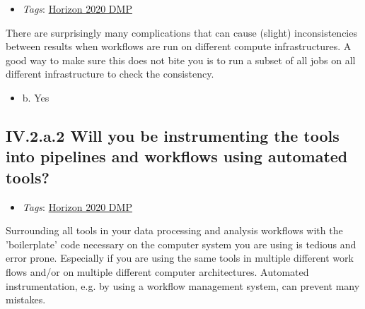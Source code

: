 \documentclass[a4paper,12pt]{report}
\begin{document}
\label{10a10ffd-bfe1-4c6b-bbb6-3dfb1e63a5d5.918d5fd1-ea37-468f-8acd-ca3e80203900.30d1e85c-0e3e-482f-97f9-22a7658b329e.e8a08f27-9f82-4147-b446-822d34a5d468}


\begin{itemize}
  \item \textit{Tags}: \ul{Horizon 2020 DMP}
  \end{itemize}


\noindent
\begin{markdown}
There are surprisingly many complications that can cause (slight) inconsistencies between results when workflows are run on different compute infrastructures. A good way to make sure this does not bite you is to run a subset of all jobs on all different infrastructure to check the consistency.
\end{markdown}



\begin{itemize}
  \item[\CheckmarkBold] b. Yes
\end{itemize}




\subsection*{\protect\textcolor{colorSecId}{IV.2.a.2} Will you be instrumenting the tools into pipelines and workflows using automated tools?}

\label{10a10ffd-bfe1-4c6b-bbb6-3dfb1e63a5d5.918d5fd1-ea37-468f-8acd-ca3e80203900.30d1e85c-0e3e-482f-97f9-22a7658b329e.a3a4ce37-4ced-41df-8ec6-e42d87a6a3f1}


\begin{itemize}
  \item \textit{Tags}: \ul{Horizon 2020 DMP}
  \end{itemize}


\noindent
\begin{markdown}
Surrounding all tools in your data processing and analysis workflows with the 'boilerplate' code necessary on the computer system you are using is tedious and error prone. Especially if you are using the same tools in multiple different work flows and/or on multiple different computer architectures. Automated instrumentation, e.g. by using a workflow management system, can prevent many mistakes.
\end{markdown}
\end{document}
